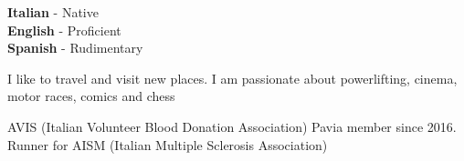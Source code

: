 \documentclass[9pt]{developercv} %
\begin{document}
\begin{entrylist}
		{}
		{}
\end{entrylist}


\begin{minipage}[t]{0.3\textwidth}
	\vspace{-\baselineskip} %

	
	\textbf{Italian} - Native\\
	\textbf{English} - Proficient\\
	\textbf{Spanish} - Rudimentary
\end{minipage}
\hfill
\begin{minipage}[t]{0.3\textwidth}
	\vspace{-\baselineskip} %
	
	
	I like to travel and visit new places. I am passionate about powerlifting, cinema, motor races, comics and chess
\end{minipage}
\hfill
\begin{minipage}[t]{0.3\textwidth}
	\vspace{-\baselineskip} %
	
	
	AVIS (Italian Volunteer Blood Donation Association) Pavia member since 2016. Runner for AISM (Italian Multiple Sclerosis Association)
\end{minipage}

\end{document}
